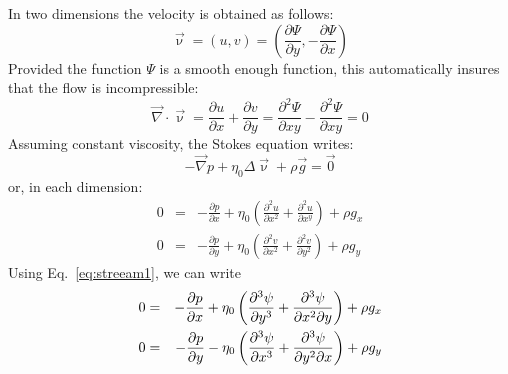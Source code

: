 In two dimensions the velocity is obtained as follows:
\begin{equation}
{\vec \upnu} = (u,v) = \left( \frac{\partial \Psi}{\partial y},-\frac{\partial \Psi}{\partial x} \right) 
\label{eq:streeam1}
\end{equation}
Provided the function $\Psi$ is a smooth enough function, 
this automatically insures that the flow is incompressible:
\begin{equation}
{\vec \nabla}\cdot {\vec \upnu} = 
\frac{\partial u}{\partial x} + \frac{\partial v}{\partial y}
=
\frac{\partial^2 \Psi}{\partial xy} - \frac{\partial^2 \Psi}{\partial xy} =0 
\end{equation}
Assuming constant viscosity, the Stokes equation writes:
\begin{equation}
-{\vec \nabla}p + \eta_0 \Delta {\vec \upnu} + \rho {\vec g} = \vec{0}
\end{equation}
or, in each dimension:
\begin{eqnarray}
0&=&-\frac{\partial p}{\partial x} 
+ \eta_0\left( \frac{\partial^2 u}{\partial x^2} + \frac{\partial^2 u}{\partial x^y} \right) + \rho g_x \\
0&=&-\frac{\partial p}{\partial y} 
+ \eta_0 \left(\frac{\partial^2 v}{\partial x^2} + \frac{\partial^2 v}{\partial y^2} \right) + \rho g_y 
\end{eqnarray}
Using Eq.~\eqref{eq:streeam1}, we can write 
\begin{eqnarray}
0 &=& -\frac{\partial p}{\partial x} + \eta_0 \left(
\frac{\partial^3 \psi}{\partial y^3}  + \frac{\partial^3 \psi}{\partial x^2 \partial y}
\right) + \rho g_x \nonumber\\
0 &=& -\frac{\partial p}{\partial y} - \eta_0 \left(
\frac{\partial^3 \psi}{\partial x^3}  + \frac{\partial^3 \psi}{\partial y^2 \partial x}
\right) + \rho g_y
\end{eqnarray}


